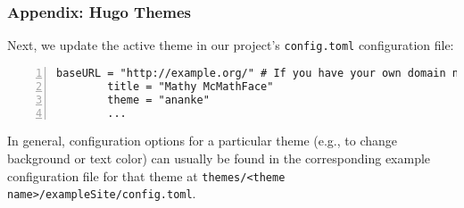 \begin{frame}[fragile]
    \frametitle{Appendix: Hugo Themes}

    Next, we update the active theme in our project's \texttt{config.toml} configuration file:

    \medskip

    \begin{lstlisting}[style=saneCode,gobble=8,title={config.toml},numbers=left]
        baseURL = "http://example.org/" # If you have your own domain name, add it here.
        title = "Mathy McMathFace"
        theme = "ananke"
        ...
    \end{lstlisting}

    \vfill

    In general, configuration options for a particular theme (e.g., to change background or text color) can usually 
    be found in the corresponding example configuration file for that theme at
    \texttt{themes/<theme name>/exampleSite/config.toml}.

\end{frame}